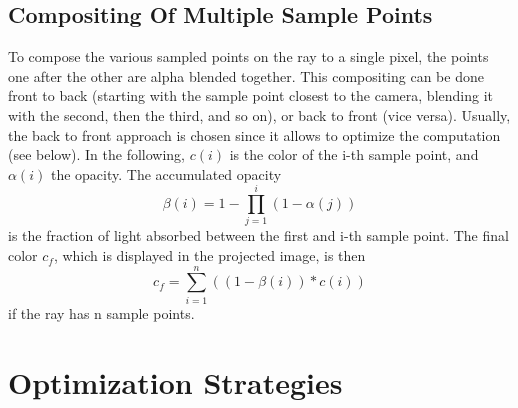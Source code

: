 { \subsection{Compositing Of Multiple Sample Points}
To compose the various sampled points on the ray to a single pixel, the points one after the other are alpha blended together. This compositing can be done front to back\cite{Sabella1988ARA, Upson1988VbufferVV } (starting with the sample point closest to the camera, blending it with the second, then the third, and so on), or back to front\cite{10.1145/378456.378484, 511} (vice versa).  Usually, the back to front approach is chosen since it allows to optimize the computation\cite{10.1145/78964.78965} (see below).
 In the following, $c(i)$ is the color of the i-th sample point, and $\alpha(i)$ the opacity. The accumulated opacity 
 \begin{equation}
 \beta(i) = 1 - \prod_{j=1}^{i}(1 - \alpha(j))
 \end{equation}
 is the fraction of light absorbed between the first and i-th sample point. The final color $c_f$, which is displayed in the projected image, is then
 \begin{equation}
 c_f = \sum_{i=1}^n((1-\beta(i)) * c(i))
 \end{equation}
 if the ray has n sample points\cite{10.1145/147130.147155}.
\section{Optimization Strategies}
}
